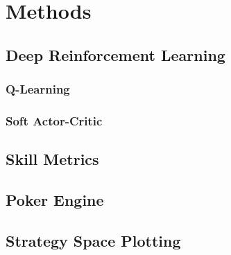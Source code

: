 \chapter{Methods}

\section{Deep Reinforcement Learning}
\subsection{Q-Learning}
\subsection{Soft Actor-Critic}
\section{Skill Metrics}
\section{Poker Engine}
\section{Strategy Space Plotting}